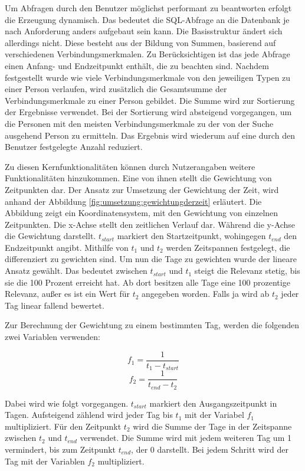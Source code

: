Um Abfragen durch den Benutzer möglichst performant zu beantworten erfolgt die Erzeugung dynamisch. Das bedeutet die SQL-Abfrage an die Datenbank je nach Anforderung anders aufgebaut sein kann. Die Basisstruktur ändert sich allerdings nicht. Diese besteht aus der Bildung von Summen, basierend auf verschiedenen Verbindungsmerkmalen. Zu Berücksichtigen ist das jede Abfrage einen Anfang- und Endzeitpunkt enthält, die zu beachten sind. Nachdem festgestellt wurde wie viele Verbindungsmerkmale von den jeweiligen Typen zu einer Person verlaufen, wird zusätzlich die Gesamtsumme der Verbindungsmerkmale zu einer Person gebildet. Die Summe wird zur Sortierung der Ergebnisse verwendet. Bei der Sortierung wird absteigend vorgegangen, um die Personen mit den meisten Verbindungsmerkmale zu der von der Suche ausgehend Person zu ermitteln. Das Ergebnis wird wiederum auf eine durch den Benutzer festgelegte Anzahl reduziert. 

Zu diesen Kernfunktionalitäten können durch Nutzerangaben weitere Funktionalitäten hinzukommen. Eine von ihnen stellt die Gewichtung von Zeitpunkten dar. Der Ansatz zur Umsetzung der Gewichtung der Zeit, wird anhand der Abbildung \ref{fig:umsetzung:gewichtungderzeit} erläutert. Die Abbildung zeigt ein Koordinatensystem, mit den Gewichtung von einzelnen Zeitpunkten. Die x-Achse stellt den zeitlichen Verlauf dar. Während die y-Achse die Gewichtung darstellt. $t_{start}$ markiert den Startzeitpunkt, wohingegen $t_{end}$ den Endzeitpunkt angibt. Mithilfe von $t_1$ und $t_2$ werden Zeitspannen festgelegt, die differenziert zu gewichten sind. Um nun die Tage zu gewichten wurde der lineare Ansatz gewählt. Das bedeutet zwischen $t_{start}$ und $t_1$ steigt die Relevanz stetig, bis sie die 100 Prozent erreicht hat. Ab dort besitzen alle Tage eine 100 prozentige Relevanz, außer es ist ein Wert für $t_2$ angegeben worden. Falls ja wird ab $t_2$ jeder Tag linear fallend bewertet. 

Zur Berechnung der Gewichtung zu einem bestimmten Tag, werden die folgenden zwei Variablen verwenden:

\begin{equation}
f_1 = \frac{1}{t_1 - t_{start}}
\end{equation}
\begin{equation}
f_2 = \frac{1}{t_{end} - t_2}
\end{equation}

Dabei wird wie folgt vorgegangen. $t_{start}$ markiert den Ausgangszeitpunkt in Tagen. Aufsteigend zählend wird jeder Tag bis $t_1$ mit der Variabel $f_1$ multipliziert. Für den Zeitpunkt $t_2$ wird die Summe der Tage in der Zeitspanne zwischen $t_2$ und $t_{end}$ verwendet. Die Summe wird mit jedem weiteren Tag um 1 vermindert, bis zum Zeitpunkt $t_{end}$, der 0 darstellt. Bei jedem Schritt wird der Tag mit der Variablen $f_2$ multipliziert.

